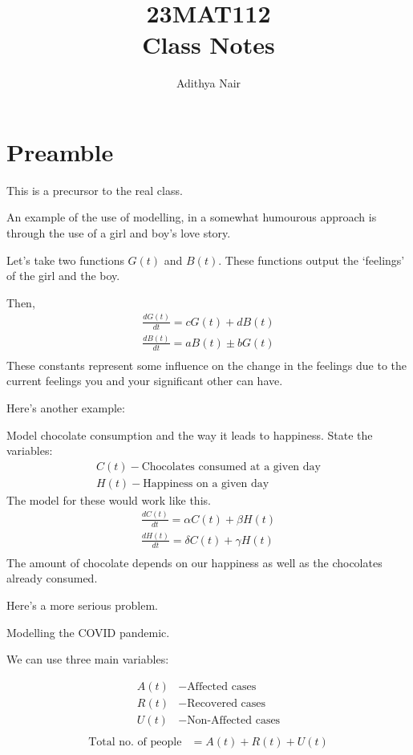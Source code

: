 \documentclass[twoside]{report}
\title{\Huge{23MAT112}\\ Class Notes}
\author{\huge{Adithya Nair}}
\date{}
\begin{document}
\chapter{Preamble}
This is a precursor to the real class.

An example of the use of modelling, in a somewhat humourous approach is through the use of a girl and boy's love story.

Let's take two functions $G(t)$ and $B(t)$. These functions output the `feelings' of the girl and the boy.

Then,
\begin{align*}
	\frac{dG(t)}{dt} = cG(t) + dB(t) \\
	\frac{dB(t)}{dt} = aB(t) \pm bG(t) \\
\end{align*}
These constants represent some influence on the change in the feelings due to the current feelings you and your significant other can have.

Here's another example:

Model chocolate consumption and the way it leads to happiness.
State the variables:
\begin{align*}
	C(t) - \text{Chocolates consumed at a given day}\\
	H(t) - \text{Happiness on a given day}
\end{align*}
The model for these would work like this.
\begin{align*}
	\frac{dC(t)}{dt} = \alpha C(t) + \beta H(t) \\
	\frac{dH(t)}{dt} = \delta C(t) + \gamma H(t) \\
\end{align*}
The amount of chocolate depends on our happiness as well as the chocolates already consumed.

Here's a more serious problem.

Modelling the COVID pandemic.

We can use three main variables:

\begin{align*}
	A(t) &- \text{Affected cases} \\
	R(t) &- \text{Recovered cases} \\
	U(t) &- \text{Non-Affected cases}\\
\end{align*}
\begin{align*}
	\text{Total no. of people} &= A(t) + R(t) + U(t) \\
\end{align*}
\end{document}
